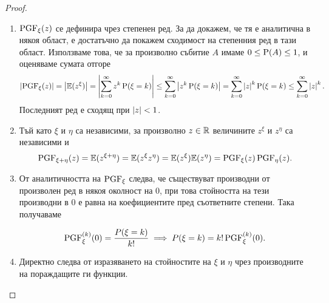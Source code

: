\documentclass[numbers=endperiod, DIV=15, bibliography=totocnumbered]{scrartcl}
\begin{document}
\begin{proof}
  \mbox{}
  \begin{enumerate}
    \item $\operatorname{PGF}_\xi(z)$ се дефинира чрез степенен ред. За да докажем, че тя е аналитична в някоя област, е достатъчно да покажем сходимост на степенния ред в тази област. Използваме това, че за произволно събитие $A$ имаме $0 \leq \operatorname{P}(A) \leq 1$, и оценяваме сумата отгоре
    \begin{displaymath}
      \left\vert \operatorname{PGF}_\xi(z) \right\vert
      =
      \left\vert \mathbb{E}(z^\xi) \right\vert
      =
      \left\vert \sum_{k=0}^\infty z^k \operatorname{P}(\xi = k) \right\vert
      \leq
      \sum_{k=0}^\infty \left\vert z^k \operatorname{P}(\xi = k) \right\vert
      =
      \sum_{k=0}^\infty \left\vert z \right\vert^k \operatorname{P}(\xi = k)
      \leq
      \sum_{k=0}^\infty \left\vert z \right\vert^k.
    \end{displaymath}
    Последният ред е сходящ при $\left\vert z \right\vert < 1$.

    \item Тъй като $\xi$ и $\eta$ са независими, за произволно $z \in \mathbb{R}$ величините $z^\xi$ и $z^\eta$ са независими и
    \begin{displaymath}
      \operatorname{PGF}_{\xi + \eta}(z)
      =
      \mathbb{E}(z^{\xi + \eta})
      =
      \mathbb{E}(z^\xi z^\eta)
      =
      \mathbb{E}(z^\xi) \mathbb{E}(z^\eta)
      =
      \operatorname{PGF}_\xi(z) \operatorname{PGF}_\eta(z).
    \end{displaymath}

    \item От аналитичността на $\operatorname{PGF}_\xi$ следва, че съществуват производни от произволен ред в някоя околност на $0$, при това стойността на тези производни в $0$ е равна на коефициентите пред съответните степени. Така получаваме

    \begin{displaymath}
      \operatorname{PGF}^{(k)}_\xi(0) = \frac {P(\xi = k)} {k!}
      \implies
      P(\xi = k) = k! \operatorname{PGF}^{(k)}_\xi(0).
    \end{displaymath}

    \item Директно следва от изразяването на стойностите на $\xi$ и $\eta$ чрез производните на пораждащите ги функции.
  \end{enumerate}
\end{proof}
\end{document}
